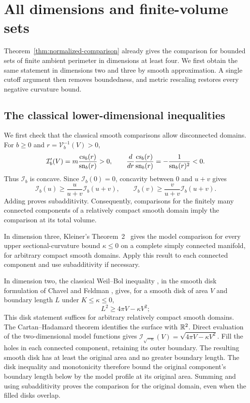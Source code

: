 \section{All dimensions and finite-volume sets}\label{sec:dimensions}

Theorem~\ref{thm:normalized-comparison} already gives the comparison for
bounded sets of finite ambient perimeter in dimensions at least four.
We first obtain the same statement in dimensions two and three by smooth
approximation. A single cutoff argument then removes boundedness, and
metric rescaling restores every negative curvature bound.

\subsection{The classical lower-dimensional inequalities}

We first check that the classical smooth comparisons allow disconnected
domains. For $b\ge0$ and $r=\mathcal V_b^{-1}(V)>0$,
\[
 \mathcal I_b'(V)=m\frac{\operatorname{cs}_b(r)}{\operatorname{sn}_b(r)}>0,
 \qquad
 \frac{d}{dr}\frac{\operatorname{cs}_b(r)}{\operatorname{sn}_b(r)}=-\frac1{\operatorname{sn}_b(r)^2}<0.
\]
Thus $\mathcal I_b$ is concave. Since $\mathcal I_b(0)=0$, concavity
between $0$ and $u+v$ gives
\[
 \mathcal I_b(u)\ge\frac{u}{u+v}\mathcal I_b(u+v),\qquad
 \mathcal I_b(v)\ge\frac{v}{u+v}\mathcal I_b(u+v).
\]
Adding proves subadditivity. Consequently, comparisons for the finitely
many connected components of a relatively compact smooth domain imply
the comparison at its total volume.

In dimension three, Kleiner's Theorem~2~\cite[p.~38]{Kleiner1992} gives
the model comparison for every upper sectional-curvature bound
$\kappa\le0$ on a complete simply connected manifold, for arbitrary
compact smooth domains. Apply this result to each connected component
and use subadditivity if necessary.

In dimension two, the classical Weil--Bol inequality
\cite{Weil1926,Bol1941}, in the smooth disk formulation of Chavel
and Feldman \cite[Isoperimetric Inequality~(I), p.~83]{ChavelFeldman1980},
gives, for a smooth disk of area $V$ and boundary length $L$ under
$K\le\kappa\le0$,
\[
 L^2\ge4\pi V-\kappa V^2;
\]
This disk statement suffices for arbitrary relatively compact smooth
domains. The Cartan--Hadamard theorem identifies the surface with $\mathbb R^2$.
Direct evaluation of the two-dimensional model functions gives
$\mathcal I_{\sqrt{-\kappa}}(V)=\sqrt{4\pi V-\kappa V^2}$.
Fill the holes in each connected component, retaining its outer boundary.
The resulting smooth disk has at least the original area and no greater
boundary length. The disk inequality and monotonicity therefore bound
the original component's boundary length below by the model profile at
its original area. Summing and using subadditivity proves the comparison
for the original domain, even when the filled disks overlap.

